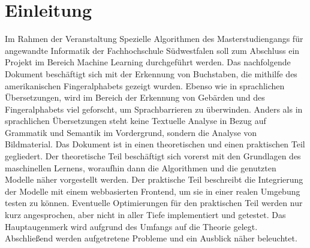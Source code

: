 \documentclass[11pt,bibliography=totocnumbered]{scrartcl}
\begin{document}
\section{Einleitung}
Im Rahmen der Veranstaltung Spezielle Algorithmen des Masterstudiengangs für angewandte Informatik der Fachhochschule Südwestfalen soll zum Abschluss ein Projekt im Bereich Machine Learning durchgeführt werden. Das nachfolgende Dokument beschäftigt sich mit der Erkennung von Buchstaben, die mithilfe des amerikanischen Fingeralphabets gezeigt wurden. Ebenso wie in sprachlichen Übersetzungen, wird im Bereich der Erkennung von Gebärden und des Fingeralphabets viel geforscht, um Sprachbarrieren zu überwinden. Anders als in sprachlichen Übersetzungen steht keine Textuelle Analyse in Bezug auf Grammatik und Semantik im Vordergrund, sondern die Analyse von Bildmaterial.  Das Dokument ist in einen theoretischen und einen praktischen Teil gegliedert. Der theoretische Teil beschäftigt sich vorerst mit den Grundlagen des maschinellen Lernens, woraufhin dann die Algorithmen und die genutzten Modelle näher vorgestellt werden. Der praktische Teil beschreibt die Integrierung der Modelle mit einem webbasierten Frontend, um sie in einer realen Umgebung testen zu können. Eventuelle Optimierungen für den praktischen Teil werden nur kurz angesprochen, aber nicht in aller Tiefe implementiert und getestet. Das Hauptaugenmerk wird aufgrund des Umfangs auf die Theorie gelegt. Abschließend werden aufgetretene Probleme und ein Ausblick näher beleuchtet.
\end{document}
